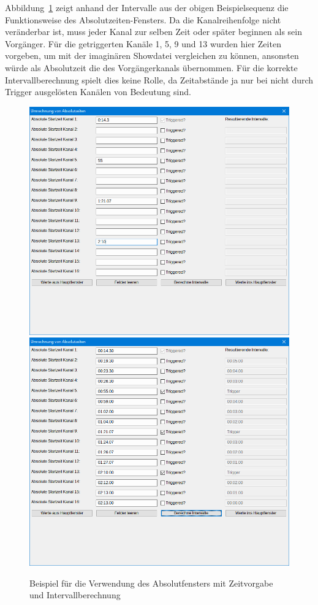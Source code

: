 \documentclass[paper=a4, open=any]{scrbook}
\begin{document}
				Abbildung~\ref{fig:beispielabsolut} zeigt anhand der Intervalle aus der obigen Beispielsequenz die Funktionsweise des Absolut\-zeiten-Fensters. Da die Kanalreihenfolge nicht veränderbar ist, muss jeder Kanal zur selben Zeit oder später beginnen als sein Vorgänger. Für die getriggerten Kanäle 1, 5, 9 und 13 wurden hier Zeiten vorgeben, um mit der imaginären Showdatei vergleichen zu können, ansonsten würde als Absolutzeit die des Vorgängerkanals übernommen. Für die korrekte Intervallberechnung spielt dies keine Rolle, da Zeitabstände ja nur bei nicht durch Trigger ausgelösten Kanälen von Bedeutung sind.
				
				\begin{figure}[tb]
					\begin{center}\includegraphics[width=.8\textwidth]{beispielzeitvorgabe}{\\}\includegraphics[width=.8\textwidth]{beispielabsolut}\end{center}
					\caption{Beispiel für die Verwendung des Absolutfensters mit Zeitvorgabe und Intervallberechnung}
					\label{fig:beispielabsolut}
				\end{figure}
			
\end{document}
